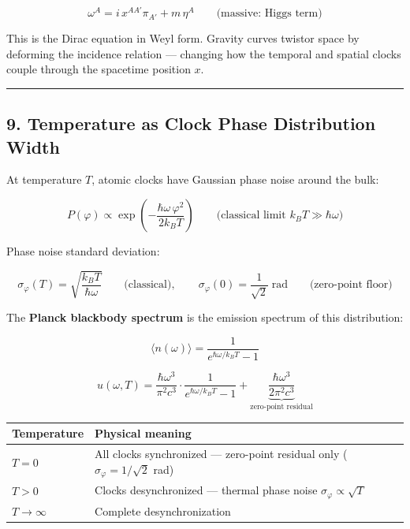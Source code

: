 \documentclass[
]{article}
\newcounter{none} %
\begin{document}
\[\omega^A = i\, x^{AA'}\pi_{A'} + m\,\eta^A \qquad \text{(massive: Higgs term)}\]

This is the Dirac equation in Weyl form. Gravity curves twistor space by
deforming the incidence relation --- changing how the temporal and
spatial clocks couple through the spacetime position \(x\).

\begin{center}\rule{0.5\linewidth}{0.5pt}\end{center}

\subsection{9. Temperature as Clock Phase Distribution
Width}\label{temperature-as-clock-phase-distribution-width}

At temperature \(T\), atomic clocks have Gaussian phase noise around the
bulk:

\[P(\varphi) \propto \exp\!\left(-\frac{\hbar\omega\,\varphi^2}{2k_BT}\right) \qquad \text{(classical limit } k_BT \gg \hbar\omega\text{)}\]

Phase noise standard deviation:

\[\sigma_\varphi(T) = \sqrt{\frac{k_B T}{\hbar\omega}} \qquad \text{(classical)}, \qquad \sigma_\varphi(0) = \frac{1}{\sqrt{2}} \; \text{rad} \qquad \text{(zero-point floor)}\]

The \textbf{Planck blackbody spectrum} is the emission spectrum of this
distribution:

\[\langle n(\omega) \rangle = \frac{1}{e^{\hbar\omega/k_BT} - 1}\]

\[u(\omega, T) = \frac{\hbar\omega^3}{\pi^2 c^3} \cdot \frac{1}{e^{\hbar\omega/k_BT} - 1} + \underbrace{\frac{\hbar\omega^3}{2\pi^2 c^3}}_{\text{zero-point residual}}\]

{\def\LTcaptype{none} %
\begin{longtable}[]{@{}
  >{\raggedright\arraybackslash}p{}
  >{\raggedright\arraybackslash}p{}@{}}
\toprule\noalign{}
\begin{minipage}[b]{\linewidth}\raggedright
Temperature
\end{minipage} & \begin{minipage}[b]{\linewidth}\raggedright
Physical meaning
\end{minipage} \\
\midrule\noalign{}
\endhead
\bottomrule\noalign{}
\endlastfoot
\(T = 0\) & All clocks synchronized --- zero-point residual only
(\(\sigma_\varphi = 1/\sqrt{2}\) rad) \\
\(T > 0\) & Clocks desynchronized --- thermal phase noise
\(\sigma_\varphi \propto \sqrt{T}\) \\
\(T \to \infty\) & Complete desynchronization \\
\end{longtable}
}
\end{document}
